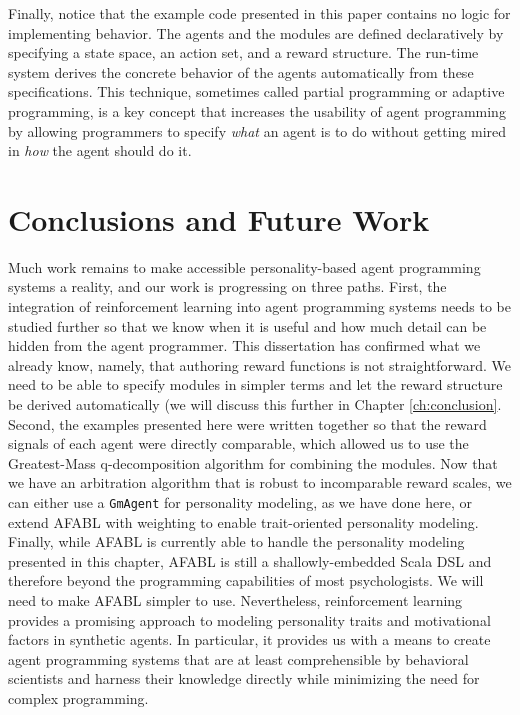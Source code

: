 
Finally, notice that the example code presented in this paper contains no logic for implementing behavior.  The agents and the modules are defined declaratively by specifying a state space, an action set, and a reward structure.  The run-time system derives the concrete behavior of the agents automatically from these specifications.  This technique, sometimes called partial programming or adaptive programming\cite{simpkins2008towards}, is a key concept that increases the usability of agent programming by allowing programmers to specify {\em what} an agent is to do without getting mired in {\em how} the agent should do it.

\section{Conclusions and Future Work}

Much work remains to make accessible personality-based agent programming systems a reality, and our work is progressing on three paths.  First, the integration of reinforcement learning into agent programming systems needs to be studied further so that we know when it is useful and how much detail can be hidden from the agent programmer. This dissertation has confirmed what we already know, namely, that authoring reward functions is not straightforward. We need to be able to specify modules in simpler terms and let the reward structure be derived automatically (we will discuss this further in Chapter \ref{ch:conclusion}. Second, the examples presented here were written together so that the reward signals of each agent were directly comparable, which allowed us to use the Greatest-Mass q-decomposition algorithm for combining the modules. Now that we have an arbitration algorithm that is robust to incomparable reward scales, we can either use a {\tt GmAgent} for personality modeling, as we have done here, or extend AFABL with weighting to enable trait-oriented personality modeling. Finally, while AFABL is currently able to handle the personality modeling presented in this chapter, AFABL is still a shallowly-embedded Scala DSL and therefore beyond the programming capabilities of most psychologists. We will need to make AFABL simpler to use. Nevertheless, reinforcement learning provides a promising approach to modeling personality traits and motivational factors in synthetic agents.  In particular, it provides us with a means to create agent programming systems that are at least comprehensible by behavioral scientists and harness their knowledge directly while minimizing the need for complex programming.
